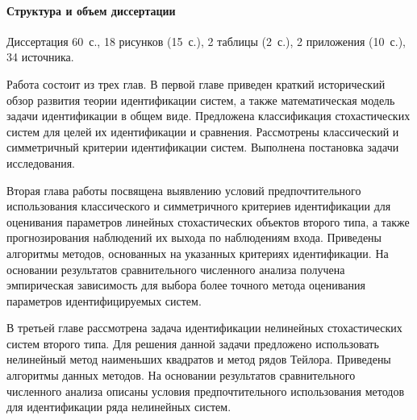 \paragraph{Структура и объем диссертации}

Диссертация 60~с., 18 рисунков (15~с.), 2 таблицы (2~с.), 2 приложения (10~с.),
34 источника.

Работа состоит из трех глав.
В первой главе приведен краткий исторический обзор развития
теории идентификации систем, а также математическая модель задачи идентификации
в общем виде. Предложена классификация стохастических систем для целей
их идентификации и сравнения. Рассмотрены классический и симметричный
критерии идентификации систем. Выполнена постановка задачи исследования.

Вторая глава работы посвящена выявлению условий предпочтительного использования
классического и симметричного критериев идентификации для
оценивания параметров линейных стохастических объектов второго типа,
а также прогнозирования наблюдений их выхода по наблюдениям входа.
Приведены алгоритмы методов, основанных на указанных критериях идентификации.
На основании результатов сравнительного численного анализа получена эмпирическая
зависимость для выбора более точного метода оценивания параметров
идентифицируемых систем.

В третьей главе рассмотрена задача идентификации нелинейных
стохастических систем второго типа.
Для решения данной задачи предложено использовать нелинейный метод
наименьших квадратов и метод рядов Тейлора.
Приведены алгоритмы данных методов.
На основании результатов сравнительного численного анализа описаны условия
предпочтительного использования методов для идентификации ряда нелинейных систем.
